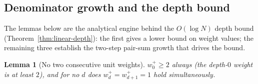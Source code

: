 \documentclass[12pt]{article}
\newtheorem{lemma}[theorem]{Lemma}
\theoremstyle{definition}
\theoremstyle{remark}
\theoremstyle{plain}
\begin{document}
\subsection*{Denominator growth and the depth bound}
\label{sec:denominator-growth}

The lemmas below are the analytical engine behind the $O(\log N)$ depth bound
(Theorem~\ref{thm:linear-depth}): the first gives a lower bound on weight values;
the remaining three establish the two-step pair-sum growth that drives the bound.

\begin{lemma}[No two consecutive unit weights]
\label{lem:no-consecutive-unit-weights}
$w^+_0 \geq 2$ always (the depth-$0$ weight is at least $2$), and for no $d$
does $w^+_d = w^+_{d+1} = 1$ hold simultaneously.
\end{lemma}
\end{document}
